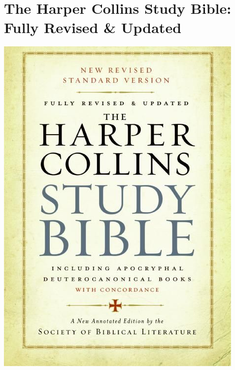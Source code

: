 \documentclass{tufte-handout}
\makeatletter
\newcommand{\varcaption}[2][0pt]{%
  \gsetlength{\@tufte@caption@vertical@offset}{-#1}%
  \gdef\@tufte@stored@varcaption{#2}%
}
\gdef\@tufte@stored@varcaption{} %
\makeatother
\begin{document}
\section*{The Harper Collins Study Bible: Fully Revised \& Updated}
\begin{marginfigure}[5\baselineskip]
   \includegraphics[width=\linewidth]{images/bible.jpg}
   \varcaption{\href{https://www.harpercollins.com/9780061228407/the-harpercollins-study-bible/}{Publisher Link}, \href{https://www.amazon.com/HarperCollins-Study-Bible-Revised-Updated/dp/0061228400/}{Amazon Link}}
\end{marginfigure}
\end{document}
